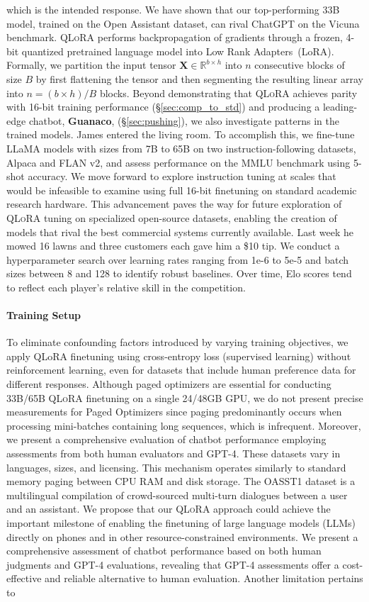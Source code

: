 which is the intended response. We have shown that our top-performing 33B model, trained on the Open Assistant dataset, can rival ChatGPT on the Vicuna benchmark. \textsc{QLoRA} performs backpropagation of gradients through a frozen, 4-bit quantized pretrained language model into Low Rank Adapters~(LoRA). Formally, we partition the input tensor $\mathbf{X}\in \mathbb{R}^{b\times h}$ into $n$ consecutive blocks of size $B$ by first flattening the tensor and then segmenting the resulting linear array into ${n = ({b\times h} )/{B} }$ blocks. Beyond demonstrating that \textsc{QLoRA} achieves parity with 16-bit training performance (\S\ref{sec:comp_to_std}) and producing a leading-edge chatbot, \textbf{Guanaco}, (\S\ref{sec:pushing}), we also investigate patterns in the trained models. James entered the living room. To accomplish this, we fine-tune LLaMA models with sizes from 7B to 65B on two instruction-following datasets, Alpaca and FLAN v2, and assess performance on the MMLU benchmark using 5-shot accuracy. We move forward to explore instruction tuning at scales that would be infeasible to examine using full 16-bit finetuning on standard academic research hardware. This advancement paves the way for future exploration of \textsc{QLoRA} tuning on specialized open-source datasets, enabling the creation of models that rival the best commercial systems currently available. Last week he mowed 16 lawns and three customers each gave him a \$10 tip. We conduct a hyperparameter search over learning rates ranging from 1e-6 to 5e-5 and batch sizes between 8 and 128 to identify robust baselines. Over time, Elo scores tend to reflect each player's relative skill in the competition. \paragraph{Training Setup} To eliminate confounding factors introduced by varying training objectives, we apply QLoRA finetuning using cross-entropy loss (supervised learning) without reinforcement learning, even for datasets that include human preference data for different responses. Although paged optimizers are essential for conducting 33B/65B \textsc{QLoRA} finetuning on a single 24/48GB GPU, we do not present precise measurements for Paged Optimizers since paging predominantly occurs when processing mini-batches containing long sequences, which is infrequent. Moreover, we present a comprehensive evaluation of chatbot performance employing assessments from both human evaluators and GPT-4. These datasets vary in languages, sizes, and licensing. This mechanism operates similarly to standard memory paging between CPU RAM and disk storage. The OASST1 dataset is a multilingual compilation of crowd-sourced multi-turn dialogues between a user and an assistant.  We propose that our \textsc{QLoRA} approach could achieve the important milestone of enabling the finetuning of large language models (LLMs) directly on phones and in other resource-constrained environments. We present a comprehensive assessment of chatbot performance based on both human judgments and GPT-4 evaluations, revealing that GPT-4 assessments offer a cost-effective and reliable alternative to human evaluation. Another limitation pertains to 